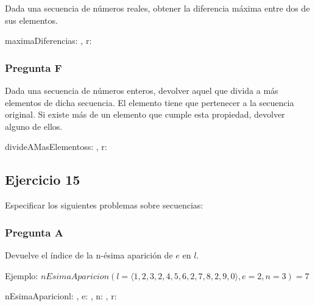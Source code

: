 Dada una secuencia de números reales, obtener la diferencia máxima entre dos de sus elementos.

\begin{proc}{maximaDiferencia}{\In s: \TLista{\float}, \Out r: \float}{}
\end{proc}

\subsubsection{Pregunta F}

Dada una secuencia de números enteros, devolver aquel que divida a más elementos de dicha secuencia. El elemento tiene que pertenecer a la secuencia original. Si existe más de un elemento que cumple esta propiedad, devolver alguno de ellos.


\begin{proc}{divideAMasElementos}{\In s: \TLista{\ent}, \Out r: \ent}{}
\end{proc}

\subsection{Ejercicio 15}

Especificar los siguientes problemas sobre secuencias:

\subsubsection{Pregunta A}

Devuelve el índice de la n-ésima aparición de $e$ en $l$.

Ejemplo: $nEsimaAparicion(l=\langle 1,2,3,2,4,5,6,2,7,8,2,9,0 \rangle, e=2, n=3) = 7$

\begin{proc}{nEsimaAparicion}{\In l: \TLista{\float}, \In e: \float, \In n: \ent, \Out r: \ent}{}
\end{proc}

